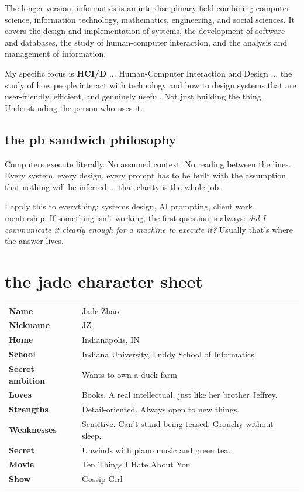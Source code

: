 \documentclass[12pt, letterpaper]{article}
\begin{document}
The longer version: informatics is an interdisciplinary field combining computer science, information technology, mathematics, engineering, and social sciences. It covers the design and implementation of systems, the development of software and databases, the study of human-computer interaction, and the analysis and management of information.

My specific focus is \textbf{HCI/D} ... Human-Computer Interaction and Design ... the study of how people interact with technology and how to design systems that are user-friendly, efficient, and genuinely useful. Not just building the thing. Understanding the person who uses it.

\subsection{the pb sandwich philosophy}

Computers execute literally. No assumed context. No reading between the lines. Every system, every design, every prompt has to be built with the assumption that nothing will be inferred ... that clarity is the whole job.

I apply this to everything: systems design, AI prompting, client work, mentorship. If something isn't working, the first question is always: \textit{did I communicate it clearly enough for a machine to execute it?} Usually that's where the answer lives.

\section{the jade character sheet}

\begin{center}
\begin{tabular}{ll}
\toprule
\textbf{Name} & Jade Zhao \\
\textbf{Nickname} & JZ \\
\textbf{Home} & Indianapolis, IN \\
\textbf{School} & Indiana University, Luddy School of Informatics \\
\textbf{Secret ambition} & Wants to own a duck farm \\
\textbf{Loves} & Books. A real intellectual, just like her brother Jeffrey. \\
\textbf{Strengths} & Detail-oriented. Always open to new things. \\
\textbf{Weaknesses} & Sensitive. Can't stand being teased. Grouchy without sleep. \\
\textbf{Secret} & Unwinds with piano music and green tea. \\
\textbf{Movie} & Ten Things I Hate About You \\
\textbf{Show} & Gossip Girl \\
\bottomrule
\end{tabular}
\end{center}
\end{document}
